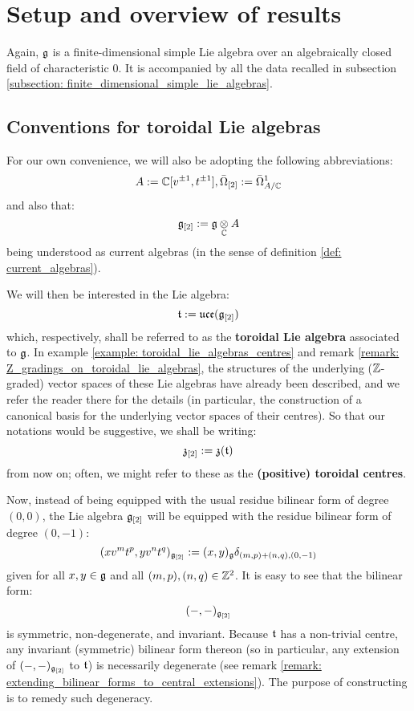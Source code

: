 \section{Setup and overview of results}
    Again, $\mathfrak{g}$ is a finite-dimensional simple Lie algebra over an algebraically closed field of characteristic $0$. It is accompanied by all the data recalled in subsection \ref{subsection: finite_dimensional_simple_lie_algebras}. 

    \subsection{Conventions for toroidal Lie algebras} \label{subsection: toroidal_lie_algebra_conventions}
        For our own convenience, we will also be adopting the following abbreviations:
            $$A := \mathbb{C}[v^{\pm 1}, t^{\pm 1}], \bar{\Omega}_{[2]} := \bar{\Omega}^1_{A/\mathbb{C}}$$
        and also that:
            $$\g_{[2]} := \g \tensor_{\bbC} A$$
        being understood as current algebras (in the sense of definition \ref{def: current_algebras}).
    
        We will then be interested in the Lie algebra:
            $$\mathfrak{t} := \mathfrak{uce}(\mathfrak{g}_{[2]})$$
        which, respectively, shall be referred to as the \textbf{toroidal Lie algebra} associated to $\mathfrak{g}$. In example \ref{example: toroidal_lie_algebras_centres} and remark \ref{remark: Z_gradings_on_toroidal_lie_algebras}, the structures of the underlying ($\mathbb{Z}$-graded) vector spaces of these Lie algebras have already been described, and we refer the reader there for the details (in particular, the construction of a canonical basis for the underlying vector spaces of their centres). So that our notations would be suggestive, we shall be writing:
            $$\mathfrak{z}_{[2]} := \mathfrak{z}(\mathfrak{t})$$
        from now on; often, we might refer to these as the \textbf{(positive) toroidal centres}.
        
        Now, instead of being equipped with the usual residue bilinear form of degree $(0, 0)$, the Lie algebra $\mathfrak{g}_{[2]}$ will be equipped with the residue bilinear form of degree $(0, -1)$:
            $$(x v^m t^p, y v^n t^q)_{\mathfrak{g}_{[2]}} := (x, y)_{\mathfrak{g}} \delta_{(m, p) + (n, q), (0, -1)}$$
        given for all $x, y \in \mathfrak{g}$ and all $(m, p), (n, q) \in \mathbb{Z}^2$. It is easy to see that the bilinear form:
            $$(-, -)_{\mathfrak{g}_{[2]}}$$
        is symmetric, non-degenerate, and invariant. Because $\mathfrak{t}$ has a non-trivial centre, any invariant (symmetric) bilinear form thereon (so in particular, any extension of $(-, -)_{\mathfrak{g}_{[2]}}$ to $\mathfrak{t}$) is necessarily degenerate (see remark \ref{remark: extending_bilinear_forms_to_central_extensions}). The purpose of constructing  is to remedy such degeneracy.

